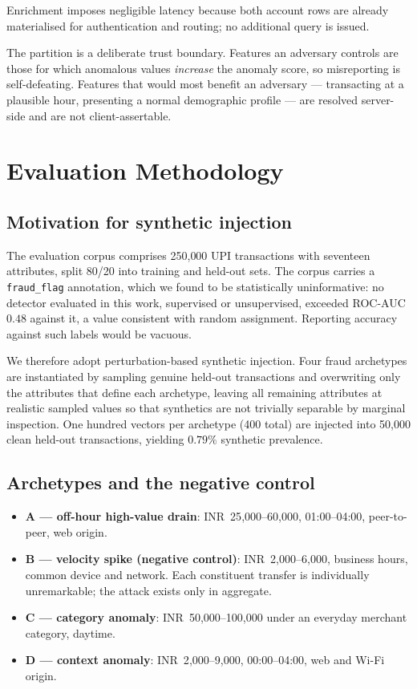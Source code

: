 \documentclass[conference]{IEEEtran}
\begin{document}
Enrichment imposes negligible latency because both account rows are already
materialised for authentication and routing; no additional query is issued.

The partition is a deliberate trust boundary. Features an adversary controls
are those for which anomalous values \emph{increase} the anomaly score, so
misreporting is self-defeating. Features that would most benefit an
adversary --- transacting at a plausible hour, presenting a normal
demographic profile --- are resolved server-side and are not client-assertable.

\section{Evaluation Methodology}
\label{sec:method}

\subsection{Motivation for synthetic injection}

The evaluation corpus comprises 250{,}000 UPI transactions with seventeen
attributes, split 80/20 into training and held-out sets. The corpus carries a
\texttt{fraud\_flag} annotation, which we found to be statistically
uninformative: no detector evaluated in this work, supervised or
unsupervised, exceeded ROC-AUC $0.48$ against it, a value consistent with
random assignment. Reporting accuracy against such labels would be vacuous.

We therefore adopt perturbation-based synthetic injection. Four fraud
archetypes are instantiated by sampling genuine held-out transactions and
overwriting only the attributes that define each archetype, leaving all
remaining attributes at realistic sampled values so that synthetics are not
trivially separable by marginal inspection. One hundred vectors per
archetype (400 total) are injected into 50{,}000 clean held-out
transactions, yielding $0.79\%$ synthetic prevalence.

\subsection{Archetypes and the negative control}

\begin{itemize}
\item \textbf{A --- off-hour high-value drain}: INR~25{,}000--60{,}000,
01:00--04:00, peer-to-peer, web origin.
\item \textbf{B --- velocity spike (negative control)}:
INR~2{,}000--6{,}000, business hours, common device and network. Each
constituent transfer is individually unremarkable; the attack exists only in
aggregate.
\item \textbf{C --- category anomaly}: INR~50{,}000--100{,}000 under an
everyday merchant category, daytime.
\item \textbf{D --- context anomaly}: INR~2{,}000--9{,}000, 00:00--04:00,
web and Wi-Fi origin.
\end{itemize}
\end{document}

